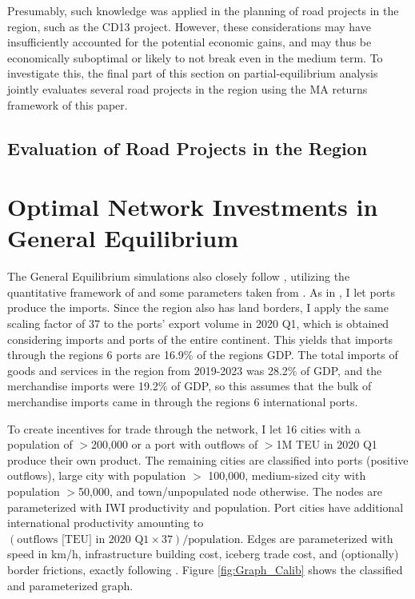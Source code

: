 \documentclass[a4paper]{article}
\begin{document}
Presumably, such knowledge was applied in the planning of road projects in the region, such as the CD13 project. However, these considerations may have insufficiently accounted for the potential economic gains, and may thus be economically suboptimal or likely to not break even in the medium term. To investigate this, the final part of this section on partial-equilibrium analysis jointly evaluates several road projects in the region using the MA returns framework of this paper.  


\subsection{Evaluation of Road Projects in the Region}




\newpage


\section{Optimal Network Investments in General Equilibrium}

The General Equilibrium simulations also closely follow \citet{krantz2024optimal}, utilizing the quantitative framework of \citet{fajgelbaum2020optimal} and some parameters taken from \citet{graff2024spatial}. As in \citet{krantz2024optimal}, I let ports produce the imports. Since the region also has land borders, I apply the same scaling factor of 37 to the ports' export volume in 2020 Q1, which is obtained considering imports and ports of the entire continent. This yields that imports through the regions 6 ports are 16.9\% of the regions GDP. The total imports of goods and services in the region from 2019-2023 was 28.2\% of GDP, and the merchandise imports were 19.2\% of GDP, so this assumes that the bulk of merchandise imports came in through the regions 6 international ports.  \newline 

To create incentives for trade through the network, I let 16 cities with a population of $>$200,000 or a port with outflows of $>$1M TEU in 2020 Q1 produce their own product. The remaining cities are classified into ports (positive outflows), large city with population $>$ 100,000, medium-sized city with population $>$50,000, and town/unpopulated node otherwise. The nodes are parameterized with IWI productivity and population. Port cities have additional international productivity amounting to $(\text{outflows [TEU] in 2020 Q1}\times 37)/\text{population}$. Edges are parameterized with speed in km/h, infrastructure building cost, iceberg trade cost, and (optionally) border frictions, exactly following \citet{krantz2024optimal}. Figure \ref{fig:Graph_Calib} shows the classified and parameterized graph. 
\end{document}
